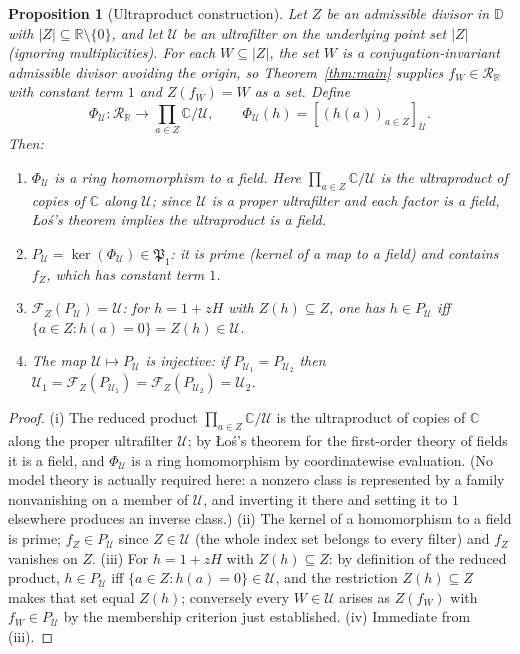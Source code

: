 \documentclass[12pt]{amsart}
\newtheorem{proposition}[theorem]{Proposition}
\theoremstyle{definition}
\newcommand{\D}{\mathbb{D}}
\newcommand{\C}{\mathbb{C}}
\newcommand{\R}{\mathbb{R}}
\newcommand{\mRR}{\mathcal{R}_{\mathbb{R}}}
\begin{document}
\begin{proposition}[Ultraproduct construction]
\label{prop:ultraproductprime}
Let $Z$ be an admissible divisor in $\D$ with $|Z| \subseteq \R
\setminus \{0\}$, and let $\mathcal{U}$ be an ultrafilter on the
underlying point set $|Z|$ (ignoring multiplicities).  For each $W
\subseteq |Z|$, the set $W$ is a conjugation-invariant admissible
divisor avoiding the origin, so Theorem~\ref{thm:main} supplies $f_W \in
\mRR$ with constant term $1$ and $Z(f_W) = W$ as a set.  Define
\[
  \Phi_\mathcal{U} \colon \mRR \to \prod_{a \in Z} \C \Big/ \mathcal{U},
  \qquad \Phi_\mathcal{U}(h) = [(h(a))_{a \in Z}]_\mathcal{U}.
\]
Then:
\begin{enumerate}
\item[(i)] $\Phi_\mathcal{U}$ is a ring homomorphism to a field.  Here
  $\prod_{a \in Z} \C / \mathcal{U}$ is the ultraproduct of copies of
  $\C$ along $\mathcal{U}$; since $\mathcal{U}$ is a proper ultrafilter
  and each factor is a field, {\L}o\'s's theorem \cite{CK} implies the
  ultraproduct is a field.
\item[(ii)] $P_\mathcal{U} = \ker(\Phi_\mathcal{U}) \in \mathfrak{P}_1$:
  it is prime (kernel of a map to a field) and contains $f_Z$, which has
  constant term $1$.
\item[(iii)] $\mathcal{F}_Z(P_\mathcal{U}) = \mathcal{U}$: for $h = 1 +
  zH$ with $Z(h) \subseteq Z$, one has $h \in P_\mathcal{U}$ iff $\{a
  \in Z : h(a) = 0\} = Z(h) \in \mathcal{U}$.
\item[(iv)] The map $\mathcal{U} \mapsto P_\mathcal{U}$ is injective: if
  $P_{\mathcal{U}_1} = P_{\mathcal{U}_2}$ then $\mathcal{U}_1 =
  \mathcal{F}_Z(P_{\mathcal{U}_1}) = \mathcal{F}_Z(P_{\mathcal{U}_2}) =
  \mathcal{U}_2$.
\end{enumerate}
\end{proposition}

\begin{proof}
(i) The reduced product $\prod_{a \in Z}\C/\mathcal{U}$ is the
ultraproduct of copies of $\C$ along the proper ultrafilter
$\mathcal{U}$; by {\L}o\'s's theorem for the first-order theory of fields
it is a field, and $\Phi_\mathcal{U}$ is a ring homomorphism by
coordinatewise evaluation.  (No model theory is actually required here:
a nonzero class is represented by a family nonvanishing on a member of
$\mathcal{U}$, and inverting it there and setting it to $1$ elsewhere
produces an inverse class.)  (ii) The kernel of a homomorphism to a
field is prime; $f_Z \in P_\mathcal{U}$ since $Z \in \mathcal{U}$ (the
whole index set belongs to every filter) and $f_Z$ vanishes on $Z$.
(iii) For $h = 1 + zH$ with $Z(h) \subseteq Z$: by definition of the
reduced product, $h \in P_\mathcal{U}$ iff $\{a \in Z : h(a) = 0\} \in
\mathcal{U}$, and the restriction $Z(h) \subseteq Z$ makes that set
equal $Z(h)$; conversely every $W \in \mathcal{U}$ arises as $Z(f_W)$
with $f_W \in P_\mathcal{U}$ by the membership criterion just
established.  (iv) Immediate from (iii).
\end{proof}
\end{document}
